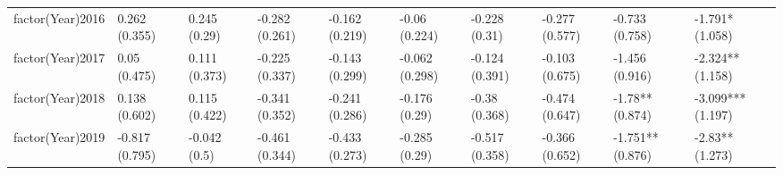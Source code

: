 \begin{table}[ht]
\begin{tabular}{llllllllll}
  factor(Year)2016 & 0.262 (0.355) & 0.245 (0.29) & -0.282 (0.261) & -0.162 (0.219) & -0.06 (0.224) & -0.228 (0.31) & -0.277 (0.577) & -0.733 (0.758) & -1.791* (1.058) \\ 
  factor(Year)2017 & 0.05 (0.475) & 0.111 (0.373) & -0.225 (0.337) & -0.143 (0.299) & -0.062 (0.298) & -0.124 (0.391) & -0.103 (0.675) & -1.456 (0.916) & -2.324** (1.158) \\ 
  factor(Year)2018 & 0.138 (0.602) & 0.115 (0.422) & -0.341 (0.352) & -0.241 (0.286) & -0.176 (0.29) & -0.38 (0.368) & -0.474 (0.647) & -1.78** (0.874) & -3.099*** (1.197) \\ 
  factor(Year)2019 & -0.817 (0.795) & -0.042 (0.5) & -0.461 (0.344) & -0.433 (0.273) & -0.285 (0.29) & -0.517 (0.358) & -0.366 (0.652) & -1.751** (0.876) & -2.83** (1.273) \\ 
   \bottomrule
\end{tabular}
\endgroup
\end{table}
